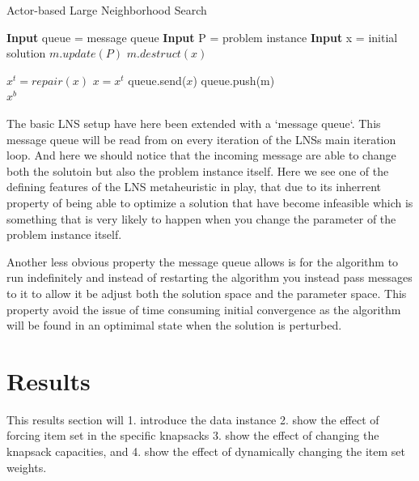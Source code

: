 \documentclass[preprint,12pt,authoryear]{elsarticle}
\begin{document}
\begin{algorithm}[H]
\caption{Actor-based Large Neighborhood Search}  \label{algo1}
\begin{algorithmic}[1]
\State \textbf{Input} queue = message queue
\State \textbf{Input} P     = problem instance
\State \textbf{Input} x     = initial solution
		\State $m.update(P)$
        \State $m.destruct(x)$
    \EndWhile
	
    \State $x^t = repair(x)$
                       \label{alg:objective_start}
        \State $x = x^t$
		\State queue.send($x$)
    \EndIf                                       \label{alg:objective_end}
	\State queue.push(m)
\EndWhile\\
\Return $x^b$
\end{algorithmic}
\end{algorithm}
The basic LNS setup have here been extended with a `message queue`. This message queue will be read from on every iteration of the LNSs main iteration loop. And here we should notice that the 
incoming message are able to change both the solutoin but also the problem instance itself. Here we see one of the defining features of the LNS metaheuristic in play, that due to its inherrent 
property of being able to optimize a solution that have become infeasible which is something that is very likely to happen when you change the parameter of the problem instance itself. 

Another less obvious property the message queue allows is for the algorithm to run indefinitely and instead of restarting the algorithm you instead pass messages to it to allow it be adjust both the solution space and the parameter space.
This property avoid the issue of time consuming initial convergence as the algorithm will be found in an optimimal state when the solution is perturbed.  

\section{Results}
\label{sec:3-results}
This results section will 1. introduce the data instance 2. show the effect of forcing item set in the specific knapsacks 3. show the effect of changing the 
knapsack capacities, and 4. show the effect of dynamically changing the item set weights. 
\end{document}
